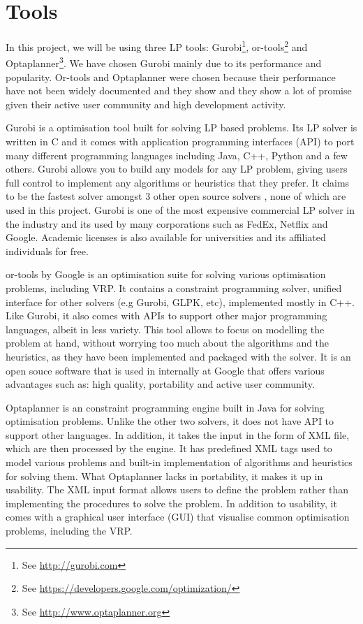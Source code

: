 \section{Tools}
In this project, we will be using three LP tools: Gurobi\footnote{See \url{http://gurobi.com}},
or-tools\footnote{See \url{https://developers.google.com/optimization/}} and Optaplanner\footnote{See \url{http://www.optaplanner.org}}.
We have chosen Gurobi mainly due to its performance and popularity. Or-tools and Optaplanner were chosen because
their performance have not been widely documented and they show and they show a lot of promise given their active user community
and high development activity.

Gurobi is a optimisation tool built for solving LP based problems. Its LP solver is written in C and it comes with
application programming interfaces (API) to port many different programming languages including Java, C++, Python and a few others. Gurobi allows you
to build any models for any LP problem, giving users full control to implement any algorithms or heuristics that they
prefer. It claims to be the fastest solver amongst 3 other open source solvers \cite{gurobi:solvers}, none
of which are used in this project. Gurobi is one of the most expensive commercial LP solver in the industry
and its used by many corporations such as FedEx, Netflix and Google. Academic licenses is also available for universities
and its affiliated individuals for free.

or-tools by Google is an optimisation suite for solving various optimisation problems, including VRP. It contains a constraint programming
solver, unified interface for other solvers (e.g Gurobi, GLPK, etc), implemented mostly in C++. Like Gurobi, it also comes with APIs
to support other major programming languages, albeit in less variety. This tool allows to focus on modelling the problem at hand, without worrying
too much about the algorithms and the heuristics, as they have been implemented and packaged with the solver. It is an open souce
software that is used in internally at Google that offers various advantages such as: high quality, portability and active user community.

Optaplanner is an constraint programming engine built in Java for solving optimisation problems. Unlike the other two solvers, it does not
have API to support other languages. In addition, it takes the input in the form of XML file, which are then processed by the engine. It has
predefined XML tags used to model various problems and built-in implementation of algorithms and heuristics for solving them. What Optaplanner
lacks in portability, it makes it up in usability. The XML input format allows users to define the problem rather than implementing the procedures
to solve the problem. In addition to usability, it comes with a graphical user interface (GUI) that visualise common optimisation problems, including the VRP.

